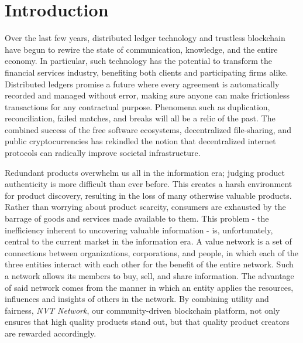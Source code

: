 
\chapter{Introduction} %

\label{Chapter1} %

Over the last few years, distributed ledger technology and trustless blockchain have begun to rewire the state of communication, knowledge, and the entire economy. In particular, such technology has the potential to transform the financial services industry, benefiting both clients and participating firms alike. Distributed ledgers promise a future where every agreement is automatically recorded and managed without error, making sure anyone can make frictionless transactions for any contractual purpose. Phenomena such as duplication, reconciliation, failed matches, and breaks will all be a relic of the past. The combined success of the free software ecosystems, decentralized file-sharing, and public cryptocurrencies has rekindled the notion that decentralized internet protocols can radically improve societal infrastructure.

Redundant products overwhelm us all in the information era; judging product authenticity is more difficult than ever before. This creates a harsh environment for product discovery, resulting in the loss of many otherwise valuable products. Rather than worrying about product scarcity, consumers are exhausted by the barrage of goods and services made available to them. This problem - the inefficiency inherent to uncovering valuable information - is, unfortunately, central to the current market in the information era. 
A value network is a set of connections between organizations, corporations, and people, in which each of the three entities interact with each other for the benefit of the entire network. Such a network allows its members to buy, sell, and share information. The advantage of said network comes from the manner in which an entity applies the resources, influences and insights of others in the network. By combining utility and fairness, \textit{NVT Network}, our community-driven blockchain platform, not only ensures that high quality products stand out, but that quality product creators are rewarded accordingly.



